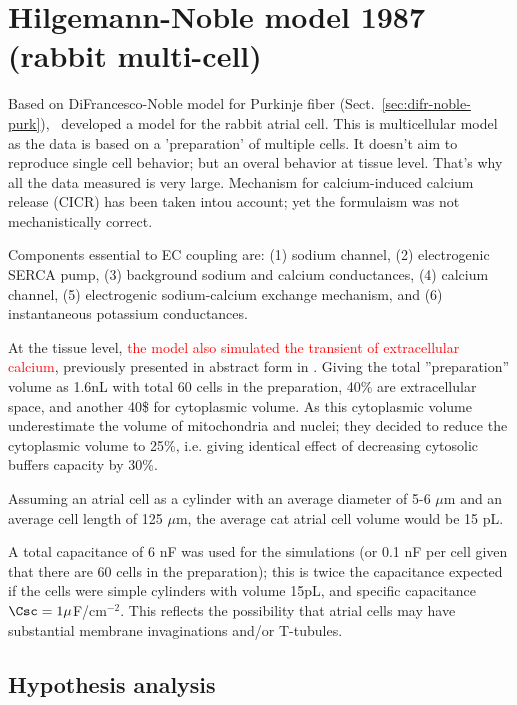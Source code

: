 \section{Hilgemann-Noble model 1987 (rabbit multi-cell)}
\label{sec:hilg-noble-model}

Based on DiFrancesco-Noble model for Purkinje fiber
(Sect.~\ref{sec:difr-noble-purk}),~\citep{hilgemann1987} developed a model for
the rabbit atrial cell.  This is multicellular model as the data is based on a
'preparation' of multiple cells. It doesn't aim to reproduce single cell
behavior; but an overal behavior at tissue level. That's why all the data
measured is very large. Mechanism for calcium-induced calcium release (CICR) has
been taken intou account; yet the formulaism was not mechanistically correct.

\begin{framed}
  Components essential to EC coupling are: (1) sodium channel, (2)
  electrogenic SERCA pump, (3) background sodium and calcium
  conductances, (4) calcium channel, (5) electrogenic sodium-calcium
  exchange mechanism, and (6) instantaneous potassium
  conductances. 
\end{framed}

At the tissue level, \textcolor{red}{the model also simulated the transient of
extracellular calcium}, previously presented in abstract form in
\citep{hilgemann1986}. Giving the total ''preparation'' volume as 1.6nL with
total 60 cells in the preparation, 40\% are extracellular space, and another
40\$ for cytoplasmic volume. As this cytoplasmic volume underestimate the volume
of mitochondria and nuclei; they decided to reduce the cytoplasmic volume to
25\%, i.e. giving identical effect of decreasing cytosolic buffers capacity by
30\%.

\begin{framed}
Assuming an atrial cell as a cylinder with an average diameter of 5-6 $\mu$m and
an average cell length of 125 $\mu$m, the average cat atrial cell volume would
be 15 pL. 
\end{framed}

A total capacitance of 6 nF was used for the simulations (or 0.1 nF per cell
given that there are 60 cells in the preparation); this is twice the capacitance
expected if the cells were simple cylinders with volume 15pL, and specific
capacitance $\Csc = 1 \mu$F/cm$^{-2}$. This reflects the possibility that atrial
cells may have substantial membrane invaginations and/or T-tubules.

\subsection{Hypothesis analysis}


